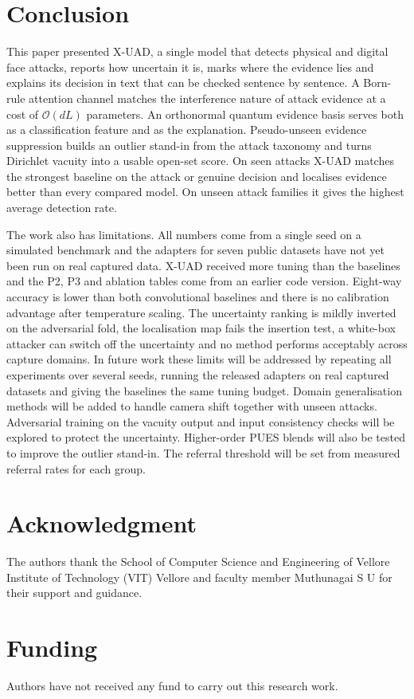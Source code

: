 \documentclass[conference]{IEEEtran}
\begin{document}
\section{Conclusion}\label{sec:concl}
This paper presented X-UAD, a single model that detects physical and digital face
attacks, reports how uncertain it is, marks where the evidence lies and explains its
decision in text that can be checked sentence by sentence. A Born-rule attention
channel matches the interference nature of attack evidence at a cost of
$\mathcal{O}(dL)$ parameters. An orthonormal quantum evidence basis serves both as a
classification feature and as the explanation. Pseudo-unseen evidence suppression
builds an outlier stand-in from the attack taxonomy and turns Dirichlet vacuity into a
usable open-set score. On seen attacks X-UAD matches the strongest baseline on the
attack or genuine decision and localises evidence better than every compared model.
On unseen attack families it gives the highest average detection rate.

The work also has limitations. All numbers come from a single seed on a simulated
benchmark and the adapters for seven public datasets have not yet been run on real
captured data. X-UAD received more tuning than the baselines and the P2, P3 and
ablation tables come from an earlier code version. Eight-way accuracy is lower than
both convolutional baselines and there is no calibration advantage after temperature
scaling. The uncertainty ranking is mildly inverted on the adversarial fold, the
localisation map fails the insertion test, a white-box attacker can switch off the
uncertainty and no method performs acceptably across capture domains. In future work
these limits will be addressed by repeating all experiments over several seeds,
running the released adapters on real captured datasets and giving the baselines the
same tuning budget. Domain generalisation methods will be added to handle camera
shift together with unseen attacks. Adversarial training on the vacuity output and
input consistency checks will be explored to protect the uncertainty. Higher-order
PUES blends will also be tested to improve the outlier stand-in. The referral threshold
will be set from measured referral rates for each group.

\section*{Acknowledgment}
The authors thank the School of Computer Science and Engineering of Vellore Institute
of Technology (VIT) Vellore and faculty member Muthunagai S U for their support and
guidance.

\section*{Funding}
Authors have not received any fund to carry out this research work.



\end{document}
